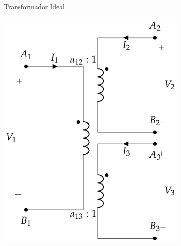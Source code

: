 \documentclass[xcolor={usenames,svgnames,dvipsnames}]{beamer}
\begin{document}
\begin{frame}[label={sec:orgc630a92}]{Transformador Ideal}
\begin{center}
\includegraphics[height=0.9\textheight]{../figs/TrafoIdealVariosDevanados.pdf}
\end{center}
\end{frame}
\end{document}
